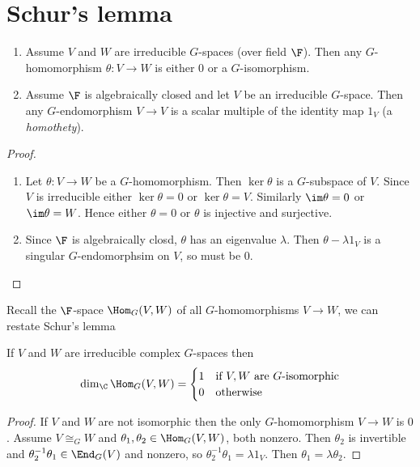 \documentclass[a4paper]{article}
\begin{document}
\section{Schur's lemma}

\begin{theorem}\leavevmode
  \begin{enumerate}
  \item Assume \(V\) and \(W\) are irreducible \(G\)-spaces (over field \(\F\)). Then any \(G\)-homomorphism \(\theta: V \to W\) is either \(0\) or a \(G\)-isomorphism.
  \item Assume \(\F\) is algebraically closed and let \(V\) be an irreducible \(G\)-space. Then any \(G\)-endomorphism \(V \to V\) is a scalar multiple of the identity map \(1_V\) (a \emph{homothety}).
  \end{enumerate}
\end{theorem}

\begin{proof}\leavevmode
  \begin{enumerate}
  \item Let \(\theta: V \to W\) be a \(G\)-homomorphism. Then \(\ker \theta\) is a \(G\)-subspace of \(V\). Since \(V\) is irreducible either \(\ker \theta = 0\) or \(\ker \theta = V\). Similarly \(\im \theta = 0\) or \(\im \theta = W\). Hence either \(\theta = 0\) or \(\theta\) is injective and surjective.
  \item Since \(\F\) is algebraically closd, \(\theta\) has an eigenvalue \(\lambda\). Then \(\theta - \lambda 1_V\) is a singular \(G\)-endomorphsim on \(V\), so must be \(0\).
  \end{enumerate}
\end{proof}

Recall the \(\F\)-space \(\Hom_G(V, W)\) of all \(G\)-homomorphisms \(V \to W\), we can restate Schur's lemma
\begin{corollary}
  If \(V\) and \(W\) are irreducible complex \(G\)-spaces then
  \[
    \dim_\C \Hom_G(V, W) =
    \begin{cases}
      1 & \text{if \(V, W\) are \(G\)-isomorphic} \\
      0 & \text{otherwise}
    \end{cases}
  \]
\end{corollary}

\begin{proof}
  If \(V\) and \(W\) are not isomorphic then the only \(G\)-homomorphism \(V \to W\) is \(0\). Assume \(V \cong_G W\) and \(\theta_1, \theta_2 \in \Hom_G(V, W)\), both nonzero. Then \(\theta_2\) is invertible and \(\theta_2^{-1}\theta_1 \in \End_G(V)\) and nonzero, so \(\theta_2^{-1}\theta_1 = \lambda 1_V\). Then \(\theta_1 = \lambda \theta_2\).
\end{proof}
\end{document}
